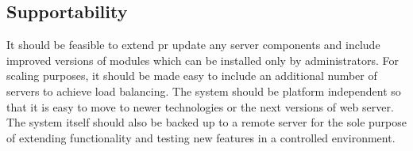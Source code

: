 \subsection{Supportability}
It should be feasible to extend pr update any server components and include
improved versions of modules which can be installed only by administrators. For
scaling purposes, it should be made easy to include an additional number of
servers to achieve load balancing. The system should be platform independent so
that it is easy to move to newer technologies or the next versions of web
server. The system itself should also be backed up to a remote server for the
sole purpose of extending functionality and testing new features in a
controlled environment.

